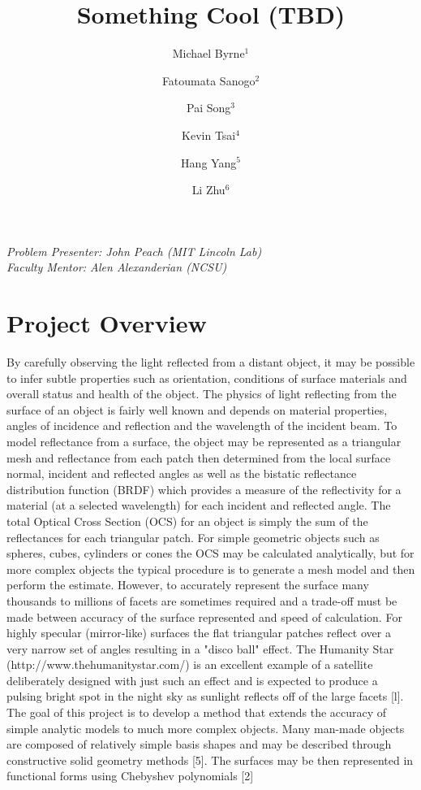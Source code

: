\documentclass[11pt]{amsart}
\author{Michael Byrne$^1$}
\author{Fatoumata Sanogo$^2$}
\author{Pai Song$^3$}
\author{Kevin Tsai$^4$}
\author{Hang Yang$^5$}
\author{Li Zhu$^6$}
\title{Something Cool (TBD)}
\theoremstyle{definition}
\begin{document}
\maketitle

{
\noindent
\textit{
Problem Presenter:  John Peach (MIT Lincoln Lab)\\
Faculty Mentor: Alen Alexanderian (NCSU)
}
}
\section{Project Overview}
By carefully observing the light reflected from a distant object, it may be possible to infer subtle properties such as
orientation, conditions of surface materials and overall status and health of the object. The physics of light reflecting from
the surface of an object is fairly well known and depends on material properties, angles of incidence and reflection and the
wavelength of the incident beam. To model reflectance from a surface, the object may be represented as a triangular mesh
and reflectance from each patch then determined from the local surface normal, incident and reflected angles as well as the
bistatic reflectance distribution function (BRDF) which provides a measure of the reflectivity for a material (at a selected
wavelength) for each incident and reflected angle.
The total Optical Cross Section (OCS) for an object is simply the sum of the reflectances for each triangular patch. For
simple geometric objects such as spheres, cubes, cylinders or cones the OCS may be calculated analytically, but for more
complex objects the typical procedure is to generate a mesh model and then perform the estimate. However, to accurately
represent the surface many thousands to millions of facets are sometimes required and a trade-off must be made between
accuracy of the surface represented and speed of calculation. For highly specular (mirror-like) surfaces the flat triangular
patches reflect over a very narrow set of angles resulting in a "disco ball" effect. The Humanity Star
(http://www.thehumanitystar.com/) is an excellent example of a satellite deliberately designed with just such an effect and
is expected to produce a pulsing bright spot in the night sky as sunlight reflects off of the large facets [l].
The goal of this project is to develop a method that extends the accuracy of simple analytic models to much more complex
objects. Many man-made objects are composed of relatively simple basis shapes and may be described through constructive
solid geometry methods [5]. The surfaces may be then represented in functional forms using Chebyshev polynomials [2]
\end{document}

